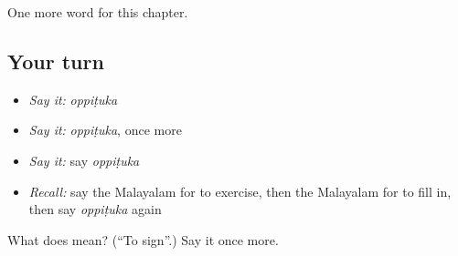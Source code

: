 \begin{grammarlens}[title={What you've built}]
One more word for this chapter.
\end{grammarlens}

\subsection*{Your turn}
\begin{itemize}
\raggedright
  \item \emph{Say it:} \emph{oppiṭuka}
  \item \emph{Say it:} \emph{oppiṭuka}, once more
  \item \emph{Say it:} say \emph{oppiṭuka}
  \item \emph{Recall:} say the Malayalam for to exercise, then the Malayalam for to fill in, then say \emph{oppiṭuka} again
\end{itemize}

\begin{tcolorbox}[breakable,colback=teal!4,colframe=teal!35!black,title={Before you move on}]
What does  mean? (\textquotedblleft{}To sign\textquotedblright{}.) Say it once more.
\end{tcolorbox}
